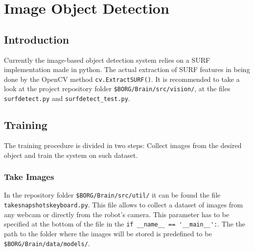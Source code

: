 \documentclass[a4paper, 12pt, oneside]{report}
\title{\titleVariable}
\author{\authorVariable}
\date{\centering First release: \firstRelease \\ Last modification: \today}
\begin{document}
\maketitle

\begin{abstract}
In this document will be described the standard procedures for object recognition.
It will be included a detailed description for training the -possibly several- systems and testing their correct functioning.
As the object detection systems used by the team are constantly evolving, this document will be continously updated in order to reflect the latest working procedures used by the team.
\end{abstract}

\tableofcontents


\chapter{Image Object Detection}

\section{Introduction}
Currently the image-based object detection system relies on a SURF implementation made in python.
The actual extraction of SURF features in being done by the OpenCV method \verb=cv.ExtractSURF()=.
It is recommended to take a look at the project repository folder \verb=$BORG/Brain/src/vision/=, at the files \verb=surfdetect.py= and \verb=surfdetect_test.py=.

\section{Training}
The training procedure is divided in two steps: Collect images from the desired object and train the system on such dataset.

\subsection{Take Images}
In the repository folder \verb=$BORG/Brain/src/util/= it can be found the file \verb=takesnapshotskeyboard.py=.
This file allows to collect a dataset of images from any webcam or directly from the robot's camera.
This parameter has to be specified at the bottom of the file in the \verb-if __name__ == '__main__':-.
The the path to the folder where the images will be stored is predefined to be \verb=$BORG/Brain/data/models/=.
\end{document}

